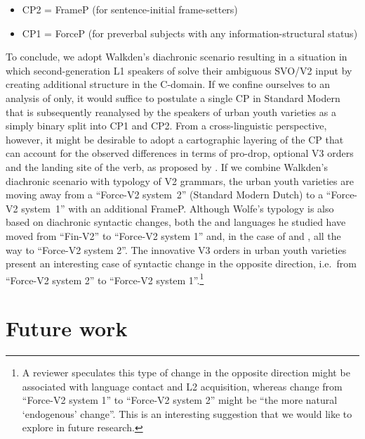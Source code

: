 \documentclass[output=paper]{langsci/langscibook}
\begin{document}
\begin{itemize}

    \item CP2 = FrameP (for sentence-initial frame-setters)

    \item CP1 = ForceP (for preverbal subjects with any information-structural
        status)

\end{itemize}

To conclude, we adopt Walkden's diachronic scenario resulting in a situation in
which second-generation L1 speakers of  solve their ambiguous SVO/V2 input
by creating additional structure in the C-domain. If we confine ourselves to an
analysis of  only, it would suffice to postulate a single CP in Standard
Modern  that is subsequently reanalysed by the speakers of urban youth
varieties as a simply binary split into CP1 and CP2. From a cross-linguistic
perspective, however, it might be desirable to adopt a cartographic layering of
the CP that can account for the observed differences in terms of pro-drop,
optional V3 orders and the landing site of the verb, as proposed by
\citet{Wolfe:2017}. If we combine Walkden's diachronic scenario with
 typology of V2 grammars, the  urban youth varieties are moving away
from a \enquote{Force-V2 system~2} (Standard Modern Dutch) to a \enquote{Force-V2 system~1}
with an additional FrameP. Although Wolfe's typology is also based on
diachronic syntactic changes,  both the  and  languages he
studied have moved from \enquote{Fin-V2} to \enquote{Force-V2 system 1} and, in
the case of  and , all the way to \enquote{Force-V2 system 2}. The
innovative V3 orders in urban youth varieties present an interesting case of
syntactic change in the opposite direction, i.e.\ from \enquote{Force-V2 system
    2} to \enquote{Force-V2 system 1}.\footnote{A reviewer speculates this type of
    change in the opposite direction might be associated with language contact
    and L2 acquisition, whereas change from \enquote{Force-V2 system 1} to
\enquote{Force-V2 system 2} might be ``the more natural `endogenous' change''.
This is an interesting suggestion that we would like to explore in future
research.}

\section{Future work}
\label{sec:fut}
\end{document}
